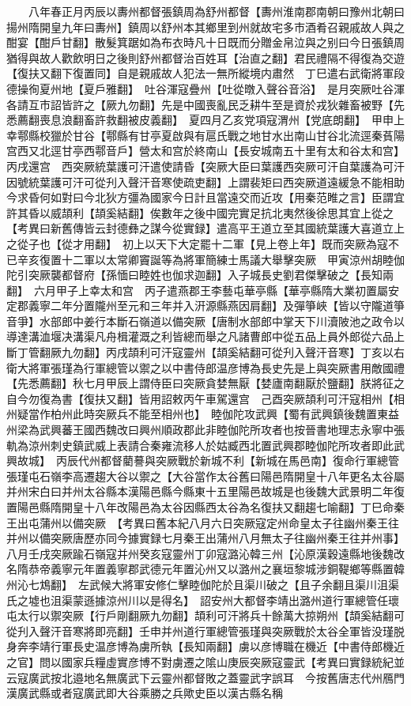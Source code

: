 　　八年春正月丙辰以夀州都督張鎮周為舒州都督【夀州淮南郡南朝曰豫州北朝曰揚州隋開皇九年曰夀州】鎮周以舒州本其鄉里到州就故宅多市酒肴召親戚故人與之酣宴【酣戶甘翻】散髮箕踞如為布衣時凡十日既而分贈金帛泣與之别曰今日張鎮周猶得與故人歡飲明日之後則舒州都督治百姓耳【治直之翻】君民禮隔不得復為交遊【復扶又翻下復置同】自是親戚故人犯法一無所縱境内肅然　丁巳遣右武衛將軍段德操徇夏州地【夏戶雅翻】　吐谷渾寇疊州【吐從暾入聲谷音浴】　是月突厥吐谷渾各請互市詔皆許之【厥九勿翻】先是中國喪亂民乏耕牛至是資於戎狄雜畜被野【先悉薦翻喪息浪翻畜許救翻被皮義翻】　夏四月乙亥党項寇渭州【党底朗翻】　甲申上幸鄠縣校獵於甘谷【鄠縣有甘亭夏啟與有扈氏戰之地甘水出南山甘谷北流逕秦萯陽宫西又北逕甘亭西鄠音戶】營太和宫於終南山【長安城南五十里有太和谷太和宫】丙戌還宫　西突厥統葉護可汗遣使請昏【突厥大臣曰葉護西突厥可汗自葉護為可汗因號統葉護可汗可從刋入聲汗音寒使疏吏翻】上謂裴矩曰西突厥道遠緩急不能相助今求昏何如對曰今北狄方彊為國家今日計且當遠交而近攻【用秦范睢之言】臣謂宜許其昏以威頡利【頡奚結翻】俟數年之後中國完實足抗北夷然後徐思其宜上從之　【考異曰新舊傳皆云封德彝之謀今從實録】遣高平王道立至其國統葉護大喜道立上之從子也【從才用翻】　初上以天下大定罷十二軍【見上卷上年】既而突厥為寇不已辛亥復置十二軍以太常卿竇誕等為將軍簡練士馬議大舉擊突厥　甲寅涼州胡睦伽陀引突厥襲都督府【孫愐曰睦姓也伽求迦翻】入子城長史劉君傑擊破之【長知兩翻】　六月甲子上幸太和宫　丙子遣燕郡王李藝屯華亭縣【華亭縣隋大業初置屬安定郡義寧二年分置隴州至元和三年并入汧源縣燕因肩翻】及彈箏峽【皆以守隴道箏音爭】水部郎中姜行本斷石嶺道以備突厥【唐制水部郎中掌天下川瀆陂池之政令以導達溝洫堰决溝渠凡舟楫灌溉之利皆總而舉之凡諸曹郎中從五品上員外郎從六品上斷丁管翻厥九勿翻】丙戌頡利可汗寇靈州【頡奚結翻可從刋入聲汗音寒】丁亥以右衛大將軍張瑾為行軍總管以禦之以中書侍郎温彦博為長史先是上與突厥書用敵國禮【先悉薦翻】秋七月甲辰上謂侍臣曰突厥貪婪無厭【婪廬南翻厭於鹽翻】朕將征之自今勿復為書【復扶又翻】皆用詔敕丙午車駕還宫　己酉突厥頡利可汗寇相州【相州疑當作柏州此時突厥兵不能至相州也】　睦伽陀攻武興【蜀有武興鎮後魏置東益州梁為武興蕃王國西魏改曰興州順政郡此非睦伽陀所攻者也按晉書地理志永寧中張軌為涼州刺史鎮武威上表請合秦雍流移人於姑臧西北置武興郡睦伽陀所攻者即此武興故城】　丙辰代州都督藺謩與突厥戰於新城不利【新城在馬邑南】復命行軍總管張瑾屯石嶺李高遷趨大谷以禦之【大谷當作太谷舊曰陽邑隋開皇十八年更名太谷屬并州宋白曰并州太谷縣本漢陽邑縣今縣東十五里陽邑故城是也後魏大武景明二年復置陽邑縣隋開皇十八年改陽邑為太谷因縣西太谷為名復扶又翻趨七喻翻】丁巳命秦王出屯蒲州以備突厥　【考異曰舊本紀八月六日突厥寇定州命皇太子往幽州秦王往并州以備突厥唐歷亦同今據實録七月秦王出蒲州八月無太子往幽州秦王往并州事】　八月壬戌突厥踰石嶺寇并州癸亥寇靈州丁卯寇潞沁韓三州【沁原漢穀遠縣地後魏改名隋恭帝義寧元年置義寧郡武德元年置沁州又以潞州之襄垣黎城涉銅鞮鄉等縣置韓州沁七鴆翻】　左武候大將軍安修仁擊睦伽陀於且渠川破之【且子余翻且渠川沮渠氏之墟也沮渠蒙遜據涼州川以是得名】　詔安州大都督李靖出潞州道行軍總管任瓌屯太行以禦突厥【行戶剛翻厥九勿翻】頡利可汗將兵十餘萬大掠朔州【頡奚結翻可從刋入聲汗音寒將即亮翻】壬申并州道行軍總管張瑾與突厥戰於太谷全軍皆没瑾脱身奔李靖行軍長史温彦博為虜所執【長知兩翻】虜以彦博職在機近【中書侍郎機近之官】問以國家兵糧虛實彦博不對虜遷之隂山庚辰突厥寇靈武【考異曰實録統紀並云寇廣武按北邉地名無廣武下云靈州都督敗之蓋靈武字誤耳　今按舊唐志代州鴈門漢廣武縣或者寇廣武即大谷乘勝之兵歟史臣以漢古縣名稱